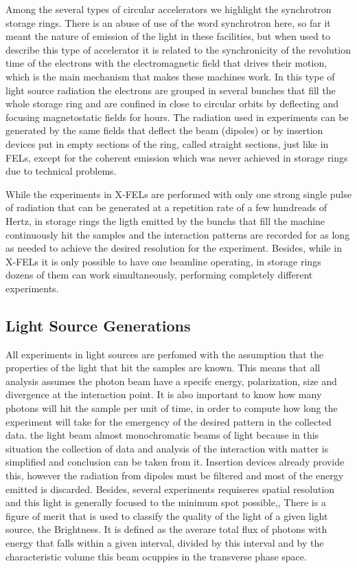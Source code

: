     Among the several types of circular accelerators we highlight the synchrotron storage rings. There is an abuse of use of the word synchrotron here, so far it meant the nature of emission of the light in these facilities, but when used to describe this type of accelerator it is related to the synchronicity of the revolution time of the electrons with the electromagnetic field that drives their motion, which is the main mechanism that makes these machines work. In this type of light source radiation the electrons are grouped in several bunches that fill the whole storage ring and are confined in close to circular orbits by deflecting and focusing magnetostatic fields for hours. The radiation used in experiments can be generated by the same fields that deflect the beam (dipoles) or by insertion devices put in empty sections of the ring, called straight sections, just like in FELs, except for the coherent emission which was never achieved in storage rings due to technical problems.

    While the experiments in X-FELs are performed with only one strong single pulse of radiation that can be generated at a repetition rate of a few hundreads of Hertz, in storage rings the ligth emitted by the bunchs that fill the machine continuously hit the samples and the interaction patterns are recorded for as long as needed to achieve the desired resolution for the experiment. Besides, while in X-FELs it is only possible to have one beamline operating, in storage rings dozens of them can work simultaneously, performing completely different experiments.


\subsection{Light Source Generations}

    All experiments in light sources are perfomed with the assumption that the properties of the light that hit the samples are known. This means that all analysis assumes the photon beam have a specifc energy, polarization, size and divergence at the interaction point. It is also important to know how many photons will hit the sample per unit of time, in order to compute how long the experiment will take for the emergency of the desired pattern in the collected data. the light beam  almost monochromatic beams of light because in this situation the collection of data and analysis of the interaction with matter is simplified and conclusion can be taken from it. Insertion devices already provide this, however the radiation from dipoles must be filtered and most of the energy emitted is discarded. Besides, several experiments requiseres spatial resolution and this light is generally focused to the minimum spot possible,,   There is a figure of merit that is used to classify the quality of the light of a given light source, the Brightness. It is defined as the averare total flux of photons with energy that falls within a given interval, divided by this interval and by the characteristic volume this beam ocuppies in the transverse phase space.

